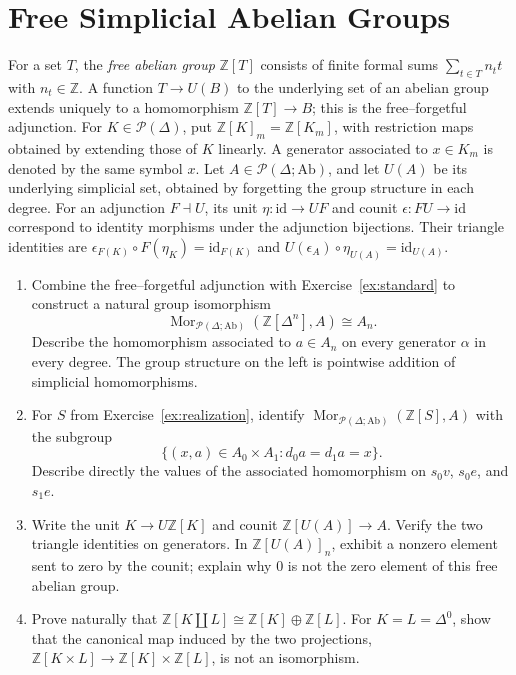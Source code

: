 \documentclass[11pt]{article}
\newcommand{\Z}{\mathbb Z}
\newcommand{\id}{\mathrm{id}}
\newcommand{\sSet}{\mathcal P(\Delta)}
\newcommand{\sAb}{\mathcal P(\Delta;\mathrm{Ab})}
\newcommand{\Mor}{\operatorname{Mor}}
\begin{document}
\section{Free Simplicial Abelian Groups}\label{ex:free}
For a set $T$, the \emph{free abelian group} $\Z[T]$ consists of finite
formal sums $\sum_{t\in T}n_t t$ with $n_t\in\Z$.
A function $T\to U(B)$ to the underlying set of an abelian group extends
uniquely to a homomorphism $\Z[T]\to B$; this is the free--forgetful
adjunction. For $K\in\sSet$, put $\Z[K]_m=\Z[K_m]$, with restriction
maps obtained by extending those of $K$ linearly. A generator associated to
$x\in K_m$ is denoted by the same symbol $x$. Let $A\in\sAb$, and let
$U(A)$ be its underlying simplicial set, obtained by forgetting the group structure in each degree.
For an adjunction $F\dashv U$, its unit $\eta:\id\to UF$ and counit
$\epsilon:FU\to\id$ correspond to identity morphisms under the
adjunction bijections. Their triangle identities are
$\epsilon_{F(K)}\circ F(\eta_K)=\id_{F(K)}$ and
$U(\epsilon_A)\circ\eta_{U(A)}=\id_{U(A)}$.
\begin{enumerate}
\item Combine the free--forgetful adjunction with
Exercise~\ref{ex:standard} to construct a natural group isomorphism
\[
\Mor_{\sAb}(\Z[\Delta^n],A)\cong A_n.
\]
Describe the homomorphism associated to $a\in A_n$ on every generator
$\alpha$ in every degree. The group structure on the left
is pointwise addition of simplicial homomorphisms.
\item For $S$ from Exercise~\ref{ex:realization}, identify
$\Mor_{\sAb}(\Z[S],A)$ with the subgroup
\[
\{(x,a)\in A_0\times A_1:d_0a=d_1a=x\}.
\]
Describe directly the values of the associated homomorphism on
$ s_0v$, $ s_0e$, and
$ s_1e$.
\item Write the unit $K\to U\Z[K]$ and counit $\Z[U(A)]\to A$.
Verify the two triangle identities on generators. In $\Z[U(A)]_n$,
exhibit a nonzero element sent to zero by the counit; explain why
$0$ is not the zero element of this free abelian group.
\item Prove naturally that $\Z[K\amalg L]\cong\Z[K]\oplus\Z[L]$.
For $K=L=\Delta^0$, show that the canonical map induced by the two
projections,
$\Z[K\times L]\to\Z[K]\times\Z[L]$, is not an isomorphism.
\end{enumerate}
\end{document}
